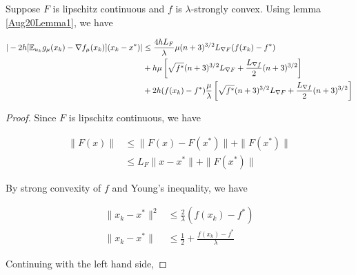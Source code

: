\documentclass{article}
\begin{document}
\begin{lemma} \label{Aug20Lemma2}
Suppose $F$ is lipschitz continuous and $f$ is $\lambda$-strongly convex. Using lemma \ref{Aug20Lemma1}, we have 

\begin{align*}
|-2h[\mathbb{E}_{u_k}g_{\mu}(x_k)-\nabla f_{\mu}(x_k)](x_k-x^*) | & \leq \frac{4hL_F}{\lambda}\mu(n+3)^{3/2}L_{\nabla F}(f(x_k) - f^*) \notag \\ & + h\mu\left[\sqrt{f^*}(n+3)^{3/2}L_{\nabla F} + \frac{L_{\nabla f}}{2}(n+3)^{3/2}\right] \notag  \\ & + 2h(f(x_k) - f^*)\frac{\mu}{\lambda}\left[\sqrt{f^*}(n+3)^{3/2}L_{\nabla F} + \frac{L_{\nabla f}}{2}(n+3)^{3/2}\right] 
\end{align*}

\begin{proof}

Since $F$ is lipschitz continuous, we have 

\begin{align*}
\|F(x) \| & \leq \|F(x) - F(x^*)\| + \|F(x^*)\| \\ & \leq L_F\|x-x^*\| + \|F(x^*)\| 
\end{align*}

By strong convexity of $f$ and Young's inequality, we have 

\begin{align*}
\|x_k-x^*\|^2 & \leq \frac{2}{\lambda}(f(x_k)-f^*) \\ \|x_k-x^*\| &  \leq \frac{1}{2} + \frac{f(x_k)-f^*}{\lambda}
\end{align*}

Continuing with the left hand side,


\end{proof}
\end{lemma}
\end{document}
